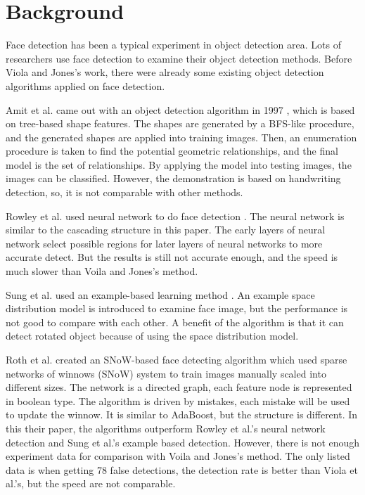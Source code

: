 \documentclass[10pt,twocolumn,letterpaper]{article}
\begin{document}
\section{Background} \label{sec:bg}
Face detection has been a typical experiment in object detection area.
Lots of researchers use face detection to examine their object detection methods.
Before Viola and Jones's work, there were already some existing object detection algorithms applied on face detection.

Amit et al. came out with an object detection algorithm in 1997 \cite{joint}, which is based on tree-based shape features.
The shapes are generated by a BFS-like procedure, and the generated shapes are applied into training images.
Then, an enumeration procedure is taken to find the potential geometric relationships, and the final model is the set of relationships.
By applying the model into testing images, the images can be classified.
However, the demonstration is based on handwriting detection, so, it is not comparable with other methods.

Rowley et al. used neural network to do face detection \cite{nnbased}.
The neural network is similar to the cascading structure in this paper.
The early layers of neural network select possible regions for later layers of neural networks to more accurate detect.
But the results is still not accurate enough, and the speed is much slower than Voila and Jones's method.

Sung et al. used an example-based learning method \cite{examplebased}.
An example space distribution model is introduced to examine face image, but the performance is not good to compare with each other.
A benefit of the algorithm is that it can detect rotated object because of using the space distribution model.

Roth et al. created an SNoW-based face detecting algorithm \cite{snowbased} which used sparse networks of winnows (SNoW) system
to train images manually scaled into different sizes. The network is a directed graph, each feature node is represented in boolean type.
The algorithm is driven by mistakes, each mistake will be used to update the winnow.
It is similar to AdaBoost, but the structure is different.
In this their paper, the algorithms outperform Rowley et al.'s neural network detection and Sung et al.'s example based detection.
However, there is not enough experiment data for comparison with Voila and Jones's method.
The only listed data is when getting 78 false detections, the detection rate is better than Viola et al.'s, but the speed are not comparable.
\end{document}
